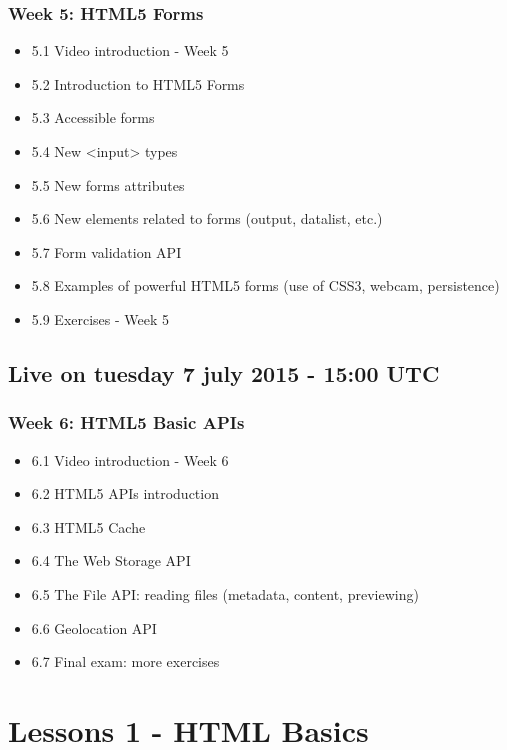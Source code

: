 \documentclass[a4paper,11pt]{book}
\begin{document}
    \subsection{Week 5: HTML5 Forms}
    \begin{itemize}
        \item 5.1 Video introduction - Week 5
        \item 5.2 Introduction to HTML5 Forms
        \item 5.3 Accessible forms
        \item 5.4 New <input> types
        \item 5.5 New forms attributes
        \item 5.6 New elements related to forms (output, datalist, etc.)
        \item 5.7 Form validation API
        \item 5.8 Examples of powerful HTML5 forms (use of CSS3, webcam, persistence)
        \item 5.9 Exercises - Week 5
    \end{itemize}

\section{Live on tuesday 7 july 2015 - 15:00 UTC}
    \subsection{Week 6: HTML5 Basic APIs}
    \begin{itemize}
        \item 6.1 Video introduction - Week 6
        \item 6.2 HTML5 APIs introduction
        \item 6.3 HTML5 Cache
        \item 6.4 The Web Storage API
        \item 6.5 The File API: reading files (metadata, content, previewing)
        \item 6.6 Geolocation API
        \item 6.7 Final exam: more exercises
    \end{itemize}


\chapter{Lessons 1 - HTML Basics}
\end{document}
